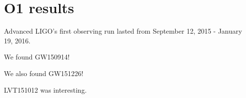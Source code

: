 \section{O1 results}

Advanced LIGO's first observing run lasted from September 12, 2015 - 
January 19, 2016.  

We found GW150914!

We also found GW151226!

LVT151012 was interesting.



